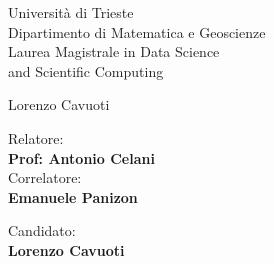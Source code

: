 \begin{titlepage}
    \begin{figure}
        \centering
        
    \end{figure}

    \begin{center}
        \LARGE{Università di Trieste\\}
        \vspace{5mm}
        \LARGE{Dipartimento di Matematica e Geoscienze\\}
        \vspace{5mm}
        \LARGE{Laurea Magistrale in Data Science \\ and Scientific Computing\\}
        
        \vspace{10mm}
        
        \vspace{10mm}
        \LARGE{Lorenzo Cavuoti}
    \end{center}

    \vspace{15mm}

    \begin{minipage}{0.47\textwidth}
        {\large{Relatore:}
        {\normalsize\vspace{3mm} \bf\\ \large{Prof: Antonio Celani}}}
        {\vspace{3mm} \large{\\Correlatore:}
        {\normalsize\vspace{3mm} \bf\\ \large{Emanuele Panizon}}}
    \end{minipage}
    \hfill
    \begin{minipage}{0.47\textwidth}\raggedleft
        {\large{Candidato:}{\normalsize\vspace{3mm} \bf\\ \large{Lorenzo Cavuoti}}}
    \end{minipage}

    \vspace{20mm}
\end{titlepage}